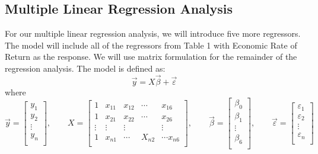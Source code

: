 \documentclass[12pt,letterpaper]{article}
\begin{document}
\subsection*{Multiple Linear Regression Analysis}

For our multiple linear regression analysis, we will introduce five more regressors. The model will include all of the regressors from Table 1 with Economic Rate of Return as the response. We will use matrix formulation for the remainder of the regression analysis. The model is defined as: $$\vec{y}=X\vec{\beta}+\vec{\varepsilon}$$ where $$\vec{y}=\begin{bmatrix}
	y_1\\
	y_2\\
	\vdots\\
	y_n\\
\end{bmatrix},\qquad X=\begin{bmatrix}
	1 & x_{11} & x_{12} & \cdots & x_{16}\\
	1 & x_{21} & x_{22} & \cdots & x_{26}\\
	\vdots & \vdots & \vdots & & \vdots\\
	1 & x_{n1} & \cdots & X_{n2} & \cdots x_{n6}\\
\end{bmatrix},\qquad \vec{\beta}=\begin{bmatrix}
	\beta_0\\
	\beta_1\\
	\vdots\\
	\beta_6\\
\end{bmatrix},\qquad \vec{\varepsilon}=\begin{bmatrix}
	\varepsilon_1\\
	\varepsilon_2\\
	\vdots\\
	\varepsilon_n\\
\end{bmatrix}$$
\end{document}
